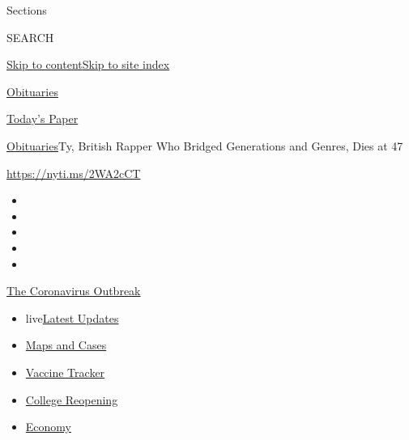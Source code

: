 Sections

SEARCH

\protect\hyperlink{site-content}{Skip to
content}\protect\hyperlink{site-index}{Skip to site index}

\href{https://www.nytimes3xbfgragh.onion/section/obituaries}{Obituaries}

\href{https://myaccount.nytimes3xbfgragh.onion/auth/login?response_type=cookie\&client_id=vi}{}

\href{https://www.nytimes3xbfgragh.onion/section/todayspaper}{Today's
Paper}

\href{/section/obituaries}{Obituaries}\textbar{}Ty, British Rapper Who
Bridged Generations and Genres, Dies at 47

\url{https://nyti.ms/2WA2cCT}

\begin{itemize}
\item
\item
\item
\item
\item
\end{itemize}

\href{https://www.nytimes3xbfgragh.onion/news-event/coronavirus?action=click\&pgtype=Article\&state=default\&region=TOP_BANNER\&context=storylines_menu}{The
Coronavirus Outbreak}

\begin{itemize}
\tightlist
\item
  live\href{https://www.nytimes3xbfgragh.onion/2020/08/04/world/coronavirus-covid-19.html?action=click\&pgtype=Article\&state=default\&region=TOP_BANNER\&context=storylines_menu}{Latest
  Updates}
\item
  \href{https://www.nytimes3xbfgragh.onion/interactive/2020/us/coronavirus-us-cases.html?action=click\&pgtype=Article\&state=default\&region=TOP_BANNER\&context=storylines_menu}{Maps
  and Cases}
\item
  \href{https://www.nytimes3xbfgragh.onion/interactive/2020/science/coronavirus-vaccine-tracker.html?action=click\&pgtype=Article\&state=default\&region=TOP_BANNER\&context=storylines_menu}{Vaccine
  Tracker}
\item
  \href{https://www.nytimes3xbfgragh.onion/2020/08/02/us/covid-college-reopening.html?action=click\&pgtype=Article\&state=default\&region=TOP_BANNER\&context=storylines_menu}{College
  Reopening}
\item
  \href{https://www.nytimes3xbfgragh.onion/live/2020/08/03/business/stock-market-today-coronavirus?action=click\&pgtype=Article\&state=default\&region=TOP_BANNER\&context=storylines_menu}{Economy}
\end{itemize}

